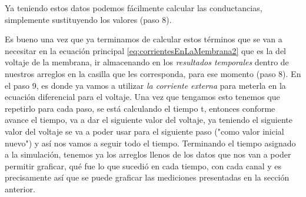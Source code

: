 Ya teniendo estos datos podemos fácilmente calcular las conductancias, simplemente sustituyendo los valores (paso 8).

Es bueno una vez que ya terminamos de calcular estos términos que se van a necesitar en la ecuación principal  \ref{eq:corrientesEnLaMembrana2} que es la del voltaje de la membrana,  ir almacenando en los \emph{resultados temporales} dentro de nuestros arreglos en la casilla que les corresponda, para ese momento (paso 8). En el paso 9, es donde ya vamos a utilizar \emph{la corriente externa} para meterla en la ecuación diferencial para el voltaje. Una vez que tengamos esto tenemos que repetirlo para cada paso, se está calculando el tiempo t,  entonces conforme avance el tiempo, va a dar el siguiente valor del voltaje, ya teniendo el siguiente valor del voltaje se va a poder usar para el siguiente paso ("como valor inicial nuevo") y así nos vamos a seguir todo el tiempo. 
Terminando el tiempo asignado a la simulación, tenemos ya los arreglos llenos de los datos que nos van a poder permitir graficar, qué fue lo que sucedió en cada tiempo, con cada canal y es precisamente  así que se puede graficar las mediciones presentadas en la sección anterior.

